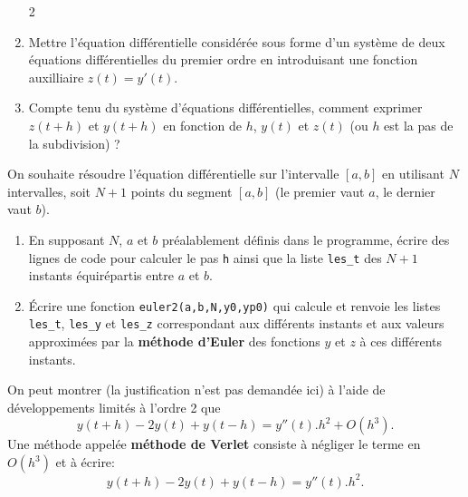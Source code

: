 \begin{enumerate}\setcounter{enumi}2\item Mettre l'équation différentielle considérée sous forme d'un système de deux équations différentielles du premier ordre en introduisant une fonction auxilliaire $z(t)=y'(t)$.
	
	\item  Compte tenu du système d'équations différentielles, comment exprimer $z(t+h)$ et $y(t+h)$ en fonction de $h$, $y(t)$ et $z(t)$ (ou $h$ est la pas de la subdivision) ?
	
\end{enumerate}

\bigskip On souhaite résoudre l'équation différentielle  sur l'intervalle $[a,b]$ en utilisant $N$ intervalles, soit $N+1$ points du segment $[a,b]$ (le premier vaut $a$, le dernier vaut $b$).

\begin{enumerate}\setcounter{enumi}4\item En supposant $N$, $a$ et $b$ préalablement définis dans le programme, écrire des lignes de code pour calculer le pas \texttt{h} ainsi que la liste \texttt{les\_t} des $N+1$ instants équirépartis entre $a$ et $b$.
	
	\item \'Ecrire une fonction \texttt{euler2(a,b,N,y0,yp0)} qui calcule et renvoie les listes \texttt{les\_t}, \texttt{les\_y} et \texttt{les\_z} correspondant aux différents instants et aux valeurs approximées par la \textbf{méthode d'Euler} des fonctions $y$ et $z$ à ces différents instants.
	
\end{enumerate}

\bigskip On peut montrer (la justification n'est pas demandée ici) à l'aide de développements limités à l'ordre 2 que $$y(t+h)-2y(t)+y(t-h)=y''(t).h^2+O(h^3).$$
Une méthode appelée \textbf{méthode de Verlet} consiste à négliger le terme en $O(h^3)$ et à écrire:
$$y(t+h)-2y(t)+y(t-h)=y''(t).h^2.$$

